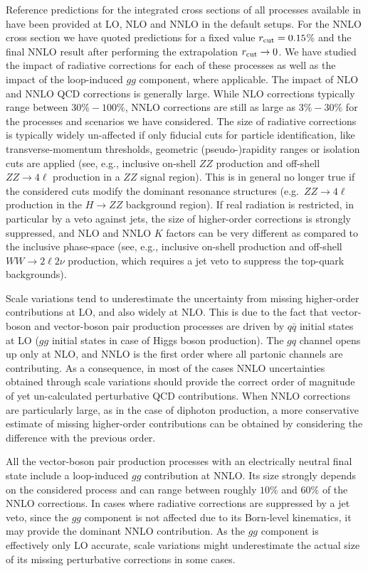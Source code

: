 \documentclass[english,11pt]{article}
\begin{document}
Reference predictions for the integrated cross sections
of all processes available in \Matrix{} have been provided at LO, NLO and NNLO in the default setups. 
For the NNLO cross section we have quoted predictions for a fixed value $r_{\mathrm{cut}}=0.15$\% and the final NNLO result
after performing the extrapolation $r_{\mathrm{cut}}\rightarrow 0$. We have studied the impact of radiative 
corrections for each of these processes as well as the impact of the 
loop-induced $gg$ component, where applicable.
The impact of NLO and NNLO QCD corrections is generally large. While NLO corrections typically range between 
$30\%-100\%$, NNLO corrections are still as large as $3\%-30\%$ for the processes 
and scenarios we have considered. 
The size of radiative corrections is typically widely un-affected if only fiducial cuts
for particle identification, like transverse-momentum thresholds, geometric (pseudo-)rapidity ranges
or isolation cuts are applied (see, e.g., inclusive on-shell $ZZ$ production
and off-shell $ZZ\to 4\ell$ production in a $ZZ$ signal region).
This is in general no longer true if the considered cuts modify the dominant resonance structures
(e.g.\ $ZZ\to 4\ell$ production in the $H\to ZZ$ background region).
If real radiation is restricted, in particular by a veto against jets,
the size of higher-order corrections is strongly suppressed, and 
NLO and NNLO $K$ factors can be very different 
as compared to the inclusive phase-space 
(see, e.g., inclusive on-shell \ww{} production and off-shell $WW\to 2\ell2\nu$ production, which requires a jet veto to
suppress the top-quark backgrounds).

Scale variations tend to underestimate the uncertainty from missing higher-order contributions at LO, and also widely at NLO. 
This is due to the fact that vector-boson and vector-boson
pair production processes are driven by $q\bar q$ initial states at LO 
($gg$ initial states in case of Higgs boson production). The $gq$ channel opens up only at NLO, 
and NNLO is the first order where all partonic channels are contributing.
As a consequence, in most of the cases NNLO uncertainties obtained 
through scale variations should provide the correct order of magnitude of yet un-calculated perturbative QCD contributions.
When NNLO corrections are particularly large, as in the case of diphoton production, a more conservative
estimate of missing higher-order contributions can be obtained by considering the difference with the previous order.

All the vector-boson pair production processes with an electrically neutral final state 
include a loop-induced $gg$ contribution at NNLO. Its size strongly 
depends on the considered process and can range between roughly $10\%$ and $60\%$ of the NNLO corrections. In cases where radiative corrections are suppressed by 
a jet veto, since the $gg$ component is not affected due to its Born-level kinematics,
it may provide the dominant NNLO contribution.
As the $gg$ component is effectively only LO accurate, scale variations might 
underestimate the actual size of its missing perturbative corrections in some cases.
\end{document}
